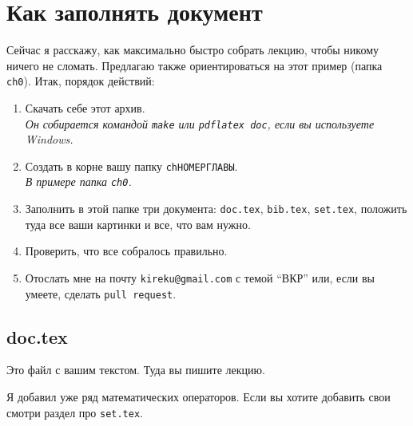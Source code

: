 \section{Как заполнять документ}

Сейчас я расскажу, как максимально быстро собрать лекцию, чтобы никому ничего не сломать.
Предлагаю также ориентироваться на этот пример (папка \texttt{ch0}). Итак, порядок действий:
\begin{enumerate}
        \item Скачать себе этот архив.\\
        \textit{Он собирается командой \texttt{make} или \texttt{pdflatex doc}, если вы используете Windows.}
                \item Создать в корне вашу папку \texttt{chНОМЕРГЛАВЫ}. \\
        \textit{В примере папка \texttt{ch0}.}
        \item Заполнить в этой папке три документа: \texttt{doc.tex}, \texttt{bib.tex}, \texttt{set.tex}, положить туда все ваши картинки и все, что вам нужно.
        \item Проверить, что все собралось правильно.
        \item Отослать мне на почту \texttt{kireku@gmail.com} с темой ``ВКР'' или, если вы умеете, сделать \texttt{pull request}.
\end{enumerate}


\subsection{doc.tex}

Это файл с вашим текстом.
Туда вы пишите лекцию.

Я добавил уже ряд математических операторов.
Если вы хотите добавить свои смотри раздел про \texttt{set.tex}.


